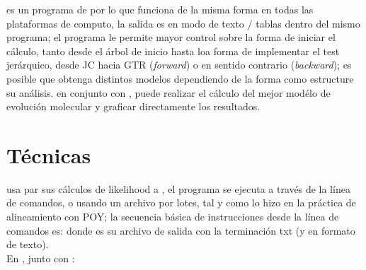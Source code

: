   es un programa de  por lo que funciona de la misma forma en todas las plataformas de computo, la  salida es en modo de texto / tablas dentro del mismo programa; el programa le permite mayor control sobre la forma de iniciar el c\'alculo, tanto desde el \'arbol de inicio hasta loa forma de implementar el test jer\'arquico, desde JC hacia GTR (\textit{forward}) o en sentido contrario  (\textit{backward}); es posible que obtenga distintos modelos dependiendo de la forma como estructure su an\'alisis.  en conjunto con ,  puede realizar el c\'alculo del mejor mod\'elo de evoluci\'on molecular y graficar directamente los resultados.


\section*{T\'ecnicas}



 usa par sus c\'alculos de likelihood a , el programa se ejecuta a trav\'es de la l\'inea de comandos, o usando un archivo por lotes, tal y como lo hizo en la pr\'actica de alineamiento con POY; %
la secuencia b\'asica de instrucciones desde la l\'inea de comandos es:
\noindent
donde  es su archivo de salida con la terminaci\'on txt (y en formato de texto).\\

En , junto con :

